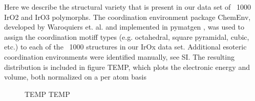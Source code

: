 

Here we describe the structural variety that is present in our data set of ~1000 IrO2 and IrO3 polymorphs.
The coordination environment package ChemEnv,
developed by Waroquiers et. al. \cite{Waroquiers2017} and implemented in pymatgen \cite{Ong2013},
was used to assign the coordination motiff types (e.g. octahedral, square pyramidal, cubic, etc.) to each of the ~1000 structures in our IrOx data set.
%
Additional esoteric coordination environments were identified manually, see SI.
The resulting distribution is included in figure TEMP, which plots the electronic energy and volume, both normalized on a per atom basis



\begin{figure}
\centering
{}
\caption{\label{fig:iro2_al}
TEMP TEMP
}
\end{figure}






